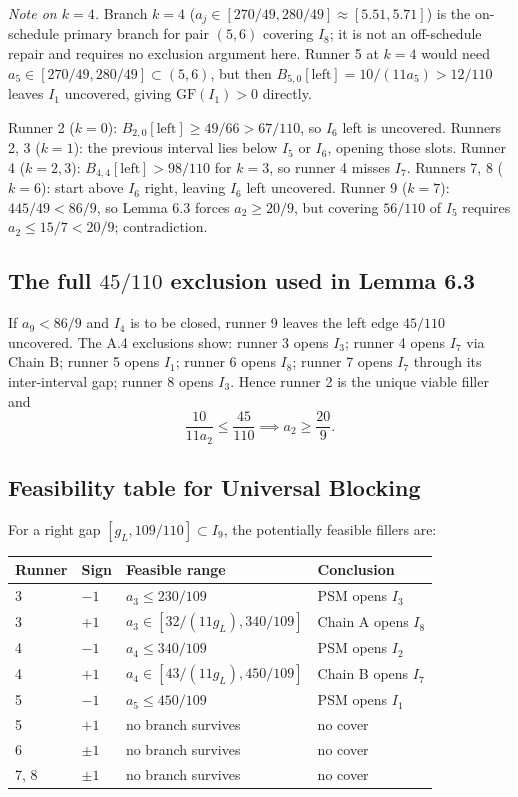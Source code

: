 \documentclass[12pt]{article}
\begin{document}
\emph{Note on $k=4$.} Branch $k=4$ ($a_j\in[270/49,280/49]\approx[5.51,5.71]$) is the
on-schedule primary branch for pair $(5,6)$ covering $I_8$; it is not an off-schedule
repair and requires no exclusion argument here. Runner 5 at $k=4$ would need
$a_5\in[270/49,280/49]\subset(5,6)$, but then $B_{5,0}[\mathrm{left}]=10/(11a_5)>12/110$
leaves $I_1$ uncovered, giving $\mathrm{GF}(I_1)>0$ directly.

Runner 2 ($k=0$): $B_{2,0}[\mathrm{left}]\ge 49/66>67/110$, so $I_6$ left is uncovered.
Runners 2, 3 ($k=1$): the previous interval lies below $I_5$ or $I_6$, opening those slots.
Runner 4 ($k=2,3$): $B_{4,4}[\mathrm{left}]>98/110$ for $k=3$, so runner 4 misses $I_7$.
Runners 7, 8 ($k=6$): start above $I_6$ right, leaving $I_6$ left uncovered.
Runner 9 ($k=7$): $445/49<86/9$, so Lemma 6.3 forces $a_2\ge 20/9$,
but covering $56/110$ of $I_5$ requires $a_2\le 15/7<20/9$; contradiction.

\subsection{The full $45/110$ exclusion used in Lemma 6.3}

If $a_9<86/9$ and $I_4$ is to be closed, runner 9 leaves the left edge $45/110$ uncovered.
The A.4 exclusions show:
runner 3 opens $I_3$; runner 4 opens $I_7$ via Chain B; runner 5 opens $I_1$;
runner 6 opens $I_8$; runner 7 opens $I_7$ through its inter-interval gap; runner 8 opens $I_3$.
Hence runner 2 is the unique viable filler and
\[
\frac{10}{11a_2} \le \frac{45}{110} \implies a_2 \ge \frac{20}{9}.
\]

\subsection{Feasibility table for Universal Blocking}

For a right gap $[g_L,109/110]\subset I_9$, the potentially feasible fillers are:

\begin{center}
\begin{tabular}{@{}llll@{}}
\toprule
Runner & Sign & Feasible range & Conclusion \\
\midrule
3 & $-1$ & $a_3\le 230/109$ & PSM opens $I_3$ \\
3 & $+1$ & $a_3\in[32/(11g_L),340/109]$ & Chain A opens $I_8$ \\
4 & $-1$ & $a_4\le 340/109$ & PSM opens $I_2$ \\
4 & $+1$ & $a_4\in[43/(11g_L),450/109]$ & Chain B opens $I_7$ \\
5 & $-1$ & $a_5\le 450/109$ & PSM opens $I_1$ \\
5 & $+1$ & no branch survives & no cover \\
6 & $\pm1$ & no branch survives & no cover \\
7, 8 & $\pm1$ & no branch survives & no cover \\
\bottomrule
\end{tabular}
\end{center}
\end{document}
